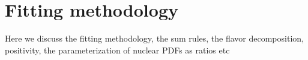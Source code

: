 
\section{Fitting methodology}

Here we discuss the fitting methodology, the sum rules,
the flavor decomposition, positivity, the parameterization
of nuclear PDFs as ratios etc
